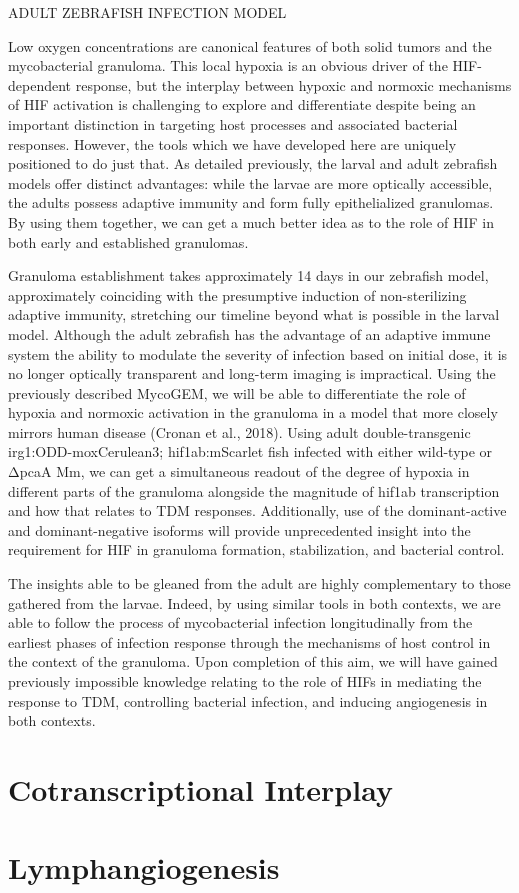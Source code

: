 ADULT ZEBRAFISH INFECTION MODEL

Low oxygen concentrations are canonical features of both solid tumors and the mycobacterial granuloma. This local hypoxia is an obvious driver of the HIF-dependent response, but the interplay between hypoxic and normoxic mechanisms of HIF activation is challenging to explore and differentiate despite being an important distinction in targeting host processes and associated bacterial responses. However, the tools which we have developed here are uniquely positioned to do just that. As detailed previously, the larval and adult zebrafish models offer distinct advantages: while the larvae are more optically accessible, the adults possess adaptive immunity and form fully epithelialized granulomas. By using them together, we can get a much better idea as to the role of HIF in both early and established granulomas. 

Granuloma establishment takes approximately 14 days in our zebrafish model, approximately coinciding with the presumptive induction of non-sterilizing adaptive immunity, stretching our timeline beyond what is possible in the larval model. Although the adult zebrafish has the advantage of an adaptive immune system the ability to modulate the severity of infection based on initial dose, it is no longer optically transparent and long-term imaging is impractical. Using the previously described MycoGEM, we will be able to differentiate the role of hypoxia and normoxic activation in the granuloma in a model that more closely mirrors human disease (Cronan et al., 2018). Using adult double-transgenic irg1:ODD-moxCerulean3; hif1ab:mScarlet fish infected with either wild-type or ΔpcaA Mm, we can get a simultaneous readout of the degree of hypoxia in different parts of the granuloma alongside the magnitude of hif1ab transcription and how that relates to TDM responses. Additionally, use of the dominant-active and dominant-negative isoforms will provide unprecedented insight into the requirement for HIF in granuloma formation, stabilization, and bacterial control. 

The insights able to be gleaned from the adult are highly complementary to those gathered from the larvae. Indeed, by using similar tools in both contexts, we are able to follow the process of mycobacterial infection longitudinally from the earliest phases of infection response through the mechanisms of host control in the context of the granuloma. Upon completion of this aim, we will have gained previously impossible knowledge relating to the role of HIFs in mediating the response to TDM, controlling bacterial infection, and inducing angiogenesis in both contexts.

\section{Cotranscriptional Interplay}


\section{Lymphangiogenesis}
